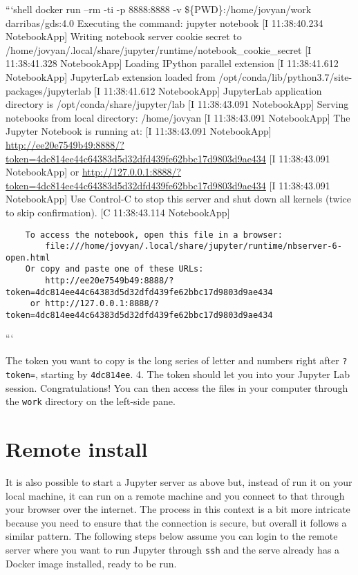 \documentclass[]{book}
\begin{document}
```shell docker run --rm -ti -p 8888:8888 -v \$\{PWD\}:/home/jovyan/work
darribas/gds:4.0 Executing the command: jupyter notebook {[}I
11:38:40.234 NotebookApp{]} Writing notebook server cookie secret to
/home/jovyan/.local/share/jupyter/runtime/notebook\_cookie\_secret {[}I
11:38:41.328 NotebookApp{]} Loading IPython parallel extension {[}I
11:38:41.612 NotebookApp{]} JupyterLab extension loaded from
/opt/conda/lib/python3.7/site-packages/jupyterlab {[}I 11:38:41.612
NotebookApp{]} JupyterLab application directory is
/opt/conda/share/jupyter/lab {[}I 11:38:43.091 NotebookApp{]} Serving
notebooks from local directory: /home/jovyan {[}I 11:38:43.091
NotebookApp{]} The Jupyter Notebook is running at: {[}I 11:38:43.091
NotebookApp{]}
\url{http://ee20e7549b49:8888/?token=4dc814ee44c64383d5d32dfd439fe62bbc17d9803d9ae434}
{[}I 11:38:43.091 NotebookApp{]} or
\url{http://127.0.0.1:8888/?token=4dc814ee44c64383d5d32dfd439fe62bbc17d9803d9ae434}
{[}I 11:38:43.091 NotebookApp{]} Use Control-C to stop this server and
shut down all kernels (twice to skip confirmation). {[}C 11:38:43.114
NotebookApp{]}

\begin{verbatim}
    To access the notebook, open this file in a browser:
        file:///home/jovyan/.local/share/jupyter/runtime/nbserver-6-open.html
    Or copy and paste one of these URLs:
        http://ee20e7549b49:8888/?token=4dc814ee44c64383d5d32dfd439fe62bbc17d9803d9ae434
     or http://127.0.0.1:8888/?token=4dc814ee44c64383d5d32dfd439fe62bbc17d9803d9ae434
\end{verbatim}

```

The token you want to copy is the long series of letter and numbers
right after \texttt{?token=}, starting by \texttt{4dc814ee}. 4. The
token should let you into your Jupyter Lab session. Congratulations! You
can then access the files in your computer through the \texttt{work}
directory on the left-side pane.

\section{Remote install}\label{remote-install}

It is also possible to start a Jupyter server as above but, instead of
run it on your local machine, it can run on a remote machine and you
connect to that through your browser over the internet. The process in
this context is a bit more intricate because you need to ensure that the
connection is secure, but overall it follows a similar pattern. The
following steps below assume you can login to the remote server where
you want to run Jupyter through \texttt{ssh} and the serve already has a
Docker image installed, ready to be run.
\end{document}
